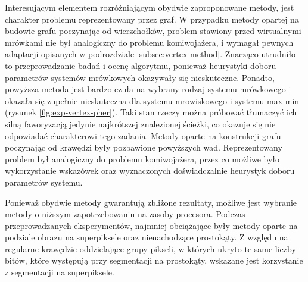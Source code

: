{{        Interesującym elementem rozróżniającym obydwie zaproponowane metody, jest charakter problemu reprezentowany
        przez graf. W przypadku metody opartej na budowie grafu poczynając od wierzchołków, problem stawiony przed
        wirtualnymi mrówkami nie był analogiczny do problemu komiwojażera, i wymagał pewnych adaptacji opisanych w
        podrozdziale \ref{subsec:vertex-method}. Znacząco utrudniło to przeprowadzanie badań i ocenę algorytmu, ponieważ
        heurystyki doboru parametrów systemów mrówkowych okazywały się nieskuteczne. Ponadto, powyższa metoda jest
        bardzo czuła na wybrany rodzaj systemu mrówkowego i okazała się zupełnie nieskuteczna dla systemu mrowiskowego
        i systemu max-min (rysunek \ref{fig:exp-vertex-pher}). Taki stan rzeczy można próbować tłumaczyć ich silną
        faworyzacją jedynie najkrótszej znalezionej ścieżki, co okazuje się nie odpowiadać charakterowi tego zadania.
        Metody oparte na konstrukcji grafu poczynając od krawędzi były pozbawione powyższych wad. Reprezentowany problem
        był analogiczny do problemu komiwojażera, przez co możliwe było wykorzystanie wskazówek oraz wyznaczonych
        doświadczalnie heurystyk doboru parametrów systemu.

        Ponieważ obydwie metody gwarantują zbliżone rezultaty, możliwe jest wybranie metody o niższym zapotrzebowaniu na
        zasoby procesora. Podczas przeprowadzanych eksperymentów, najmniej obciążające były metody oparte na podziale
        obrazu na superpiksele oraz nienachodzące prostokąty. Z względu na regularne krawędzie oddzielające grupy
        pikseli, w których ukryto te same liczby bitów, które występują przy segmentacji na prostokąty, wskazane jest
        korzystanie z segmentacji na superpiksele.
    }
}



%
%
%
%

